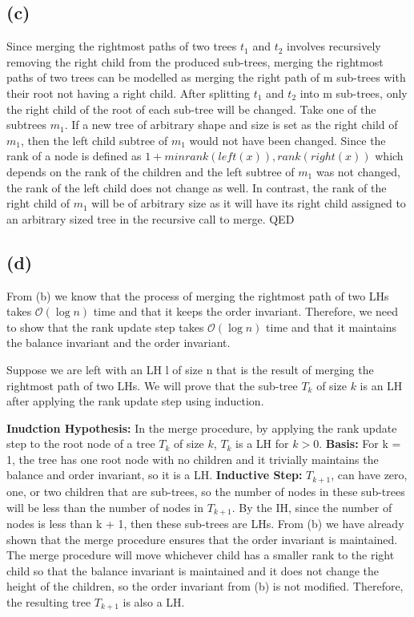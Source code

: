     \subsection{(c)}
     Since merging the rightmost paths of two trees $t_1$ and $t_2$ involves recursively removing the right child from the produced sub-trees, merging the rightmost paths of two trees can be modelled as merging the right path of m sub-trees with their root not having a right child. After splitting $t_1$ and $t_2$ into m sub-trees, only the right child of the root of each sub-tree will be changed. Take one of the subtrees $m_1$. If a new tree of arbitrary shape and size is set as the right child of $m_1$, then the left child subtree of $m_1$ would not have been changed. Since the rank of a node is defined as $1 + min{rank(left(x)), rank(right(x))}$ which depends on the rank of the children and the left subtree of $m_1$ was not changed, the rank of the left child does not change as well. In contrast, the rank of the right child of $m_1$ will be of arbitrary size as it will have its right child assigned to an arbitrary sized tree in the recursive call to merge. QED

    \subsection{(d)}
    From (b) we know that the process of merging the rightmost path of two LHs takes $\mathcal{O}(\log{n})$ time and that it keeps the order invariant. Therefore, we need to show that the rank update step takes $\mathcal{O}(\log{n})$ time and that it maintains the balance invariant and the order invariant.

    Suppose we are left with an LH l of size n that is the result of merging the rightmost path of two LHs.
    We will prove that the sub-tree $T_k$ of size $k$ is an LH after applying the rank update step using induction.
    
    \textbf{Inudction Hypothesis:} In the merge procedure, by applying the rank update step to the root node of a tree $T_k$ of size $k$, $T_k$ is a LH for $k > 0$.
    \textbf{Basis:} For k = 1, the tree has one root node with no children and it trivially maintains the balance and order invariant, so it is a LH.
    \textbf{Inductive Step:} $T_{k+1}$, can have zero, one, or two children that are sub-trees, so the number of nodes in these sub-trees will be less than the number of nodes in $T_{k+1}$. By the IH, since the number of nodes is less than k + 1, then these sub-trees are LHs. From (b) we have already shown that the merge procedure ensures that the order invariant is maintained. The merge procedure will move whichever child has a smaller rank to the right child so that the balance invariant is maintained and it does not change the height of the children, so the order invariant from (b) is not modified. Therefore, the resulting tree $T_{k+1}$ is also a LH.

